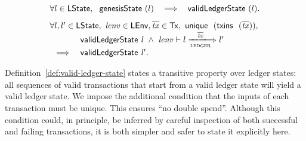 \begin{definition}
    $$
  \begin{array}{l}
    \forall l \in \LState,~~\applyFun{genesisState}(l)~~\implies~~ \applyFun{validLedgerState}(l). \\[2ex]
    \forall l, l' \in \LState, ~\var{lenv} \in \LEnv, \overline{\var{tx}} \in \Tx, ~\applyFun{unique}  ~(\applyFun{txins}~(\overline{\var{tx}})), \\
    \begin{array}{ll}
               & \applyFun{validLedgerState} l ~\wedge~ \var{lenv} \vdash l \transstar{ledger}{\overline{\var{tx}}} l' \\
      \implies & \applyFun{validLedgerState} l'.
    \end{array}
  \end{array}
    $$
  \label{def:valid-ledger-state}
\end{definition}

\noindent
Definition~\ref{def:valid-ledger-state} states a transitive property over ledger states: all sequences of valid transactions that start from a valid ledger state will yield a valid ledger state.
We impose the additional condition that the inputs of each transaction must be
unique.  This ensures ``no double spend''.  Although this condition could, in principle, be
inferred by careful inspection of both successful and failing transactions, it is both simpler
and safer to state it explicitly here.


